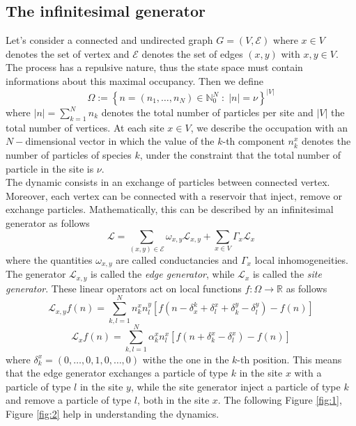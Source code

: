 \documentclass[11pt]{article}
\numberwithin{equation}{subsection}
\newcommand{\twoj}{\nu}
\begin{document}
\subsection{The infinitesimal generator}
Let's consider a connected and undirected graph $G=(V,\mathcal{E})$ where $x\in V$ denotes the set of vertex and $\mathcal{E}$ denotes the set of edges $(x,y)$ with $x,y\in V$.  The process has a repulsive nature, thus the state space must contain informations about this maximal occupancy. Then we define 
\begin{equation}\label{stateSpace}
    \Omega:=\left\{n=(n_{1},\ldots,n_{N})\in\mathbb{N}_0^{N}\;:\; |n|=\twoj\right\}^{|V|}
\end{equation}
where $|n|=\sum_{k=1}^{N}n_{k}$ denotes the total number of particles per site and $|V|$  the total number of vertices. At each site $x\in V$, we describe the occupation with an $N-$dimensional vector in which the value of the $k$-th component $n_{k}^{x}$ denotes the number of particles of species $k$, under the constraint that the total number of particle in the site is $\twoj$. \\
The dynamic consists in an exchange of particles between connected vertex. Moreover, each vertex can be connected with a reservoir that inject, remove or exchange particles. Mathematically, this can be described by an infinitesimal generator as follows
\begin{equation}\label{Generator}
    \mathcal{L}=\sum_{(x,y)\in \mathcal{E}}\omega_{x,y}\mathcal{L}_{x,y}+\sum_{x\in V}\Gamma_{x}\mathcal{L}_{x}
\end{equation}
where the quantities $ \omega_{x,y}$ are called conductancies and $\Gamma_{x}$ local inhomogeneities. The generator $\mathcal{L}_{x,y}$ is called the \textit{edge generator}, while $\mathcal{L}_{x}$ is called the \textit{site generator}. These linear operators act on local functions $f:\Omega\to \mathbb{R}$ as follows
\begin{equation}
\mathcal{L}_{x,y}f(n)=\sum_{k,l=1}^{N}n_{k}^{x}n_{l}^{y}\left[f(n-\delta_{x}^{k}+\delta_{l}^{x}+\delta_{k}^{y}-\delta_{l}^{y})-f(n)\right]
\end{equation}
\begin{equation}
    \mathcal{L}_{x}f(n)=\sum_{k,l=1}^{N}\alpha_{k}^{x}n_{l}^{x}\left[f(n+\delta_{k}^{x}-\delta_{l}^{x})-f(n)\right]
\end{equation}
where 
$\delta_{k}^{x}=(0,\ldots,0,1,0,\ldots,0)$ withe the one in the $k$-th position. This means that the edge generator exchanges a particle of type $k$ in the site $x$ with a particle of type $l$ in the site $y$, while the site generator inject a particle of type $k$ and remove a particle of type $l$, both in the site $x$. The following Figure \ref{fig:1}, Figure \ref{fig:2} help in understanding the dynamics. 
\end{document}
